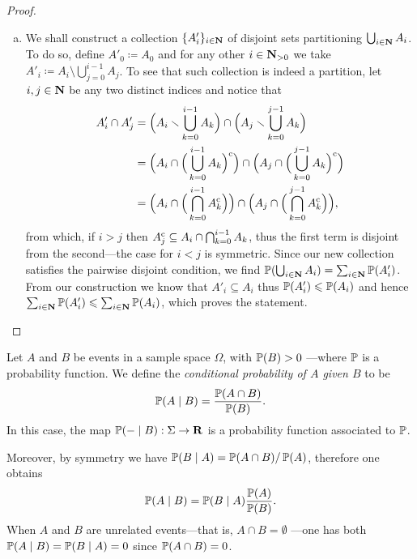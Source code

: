 \begin{proof}
\begin{enumerate}[(a)]
\item We shall construct a collection \(\{A'_{i}\}_{i \in \mathbf{N}}\) of disjoint sets
  partitioning \(\bigcup_{i \in \mathbf{N}} A_i\). To do so, define
  \(A'_{0} \coloneq A_{0}\) and for any other \(i \in \mathbf{N}_{> 0}\) we take
  \(A'_i \coloneq A_i \setminus \bigcup_{j = 0}^{i-1} A_j\). To see that such
  collection is indeed a partition, let \(i, j \in \mathbf{N}\) be any two distinct indices and
  notice that
  \begin{align*}
    A_i' \cap A_j'
    &= \Big( A_i \smallsetminus \bigcup_{k=0}^{i-1} A_k \Big)
    \cap \Big( A_j \smallsetminus \bigcup_{k=0}^{j-1} A_k \Big) \\
    &= \Big( A_i \cap \Big(\bigcup_{k=0}^{i-1} A_k\Big)^{\text{c}} \Big)
      \cap \Big( A_j \cap \Big(\bigcup_{k=0}^{j-1} A_k\Big)^{\text{c}} \Big) \\
    &= \Big( A_i \cap \Big(\bigcap_{k=0}^{i-1} {A}^{\text{c}}_k\Big) \Big)
      \cap \Big( A_j \cap \Big(\bigcap_{k=0}^{j-1} {A}^{\text{c}}_k\Big) \Big),
  \end{align*}
  from which, if \(i > j\) then
  \({A}^{\text{c}}_j \subseteq A_i \cap \bigcap_{k=0}^{i-1} A_k\), thus the first term
  is disjoint from the second---the case for \(i < j\) is symmetric. Since our
  new collection satisfies the pairwise disjoint condition, we find
  \(\operatorname{\mathbb{P}}(\bigcup_{i \in \mathbf{N}} A_i) = \sum_{i \in \mathbf{N}} \operatorname{\mathbb{P}}(A'_i)\). From our
  construction we know that \(A'_i \subseteq A_i\) thus \(\operatorname{\mathbb{P}}(A'_i) \leqslant
  \operatorname{\mathbb{P}}(A_i)\) and hence \(\sum_{i \in \mathbf{N}} \operatorname{\mathbb{P}}(A_i') \leqslant \sum_{i \in \mathbf{N}}
  \operatorname{\mathbb{P}}(A_i)\), which proves the statement.
\end{enumerate}
\end{proof}

\begin{definition}
\label{def:conditional-probability}
Let \(A\) and \(B\) be events in a sample space \(\Omega\), with
\(\operatorname{\mathbb{P}}(B) > 0\) ---where \(\operatorname{\mathbb{P}}\) is a probability function. We define the
\emph{conditional probability of \(A\) given \(B\)} to be
\[
\operatorname{\mathbb{P}}(A \mid B) = \frac{\operatorname{\mathbb{P}}(A \cap B)}{\operatorname{\mathbb{P}}(B)}.
\]
In this case, the map \(\operatorname{\mathbb{P}}(- \mid B): \Sigma \to \mathbf{R}\) is a probability
function associated to \(\operatorname{\mathbb{P}}\).
\end{definition}

Moreover, by symmetry we have \(\operatorname{\mathbb{P}}(B \mid A) = \operatorname{\mathbb{P}}(A \cap B)/\operatorname{\mathbb{P}}(A)\),
therefore one obtains
\[
\operatorname{\mathbb{P}}(A \mid B) = \operatorname{\mathbb{P}}(B \mid A) \frac{\operatorname{\mathbb{P}}(A)}{\operatorname{\mathbb{P}}(B)}.
\]
When \(A\) and \(B\) are unrelated events---that is, \(A \cap B = \emptyset\)
---one has both \(\operatorname{\mathbb{P}}(A \mid B) = \operatorname{\mathbb{P}}(B \mid A) = 0\) since
\(\operatorname{\mathbb{P}}(A \cap B) = 0\).

